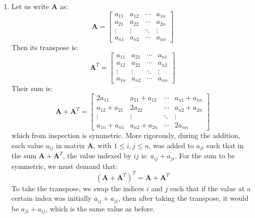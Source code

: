 \begin{sol}
\begin{enumerate}[label=\textbf{(\alph*)}]
    \item Let us write $\bm{A}$ as:
    \begin{equation}
        \bm{A} = \begin{bmatrix}
        a_{11} & a_{12} & \cdots & a_{1n} \\ 
        a_{21} & a_{22} & \cdots & a_{2n} \\ 
        \vdots & \vdots & \ddots & \vdots \\ 
        a_{n1} & a_{n2} & \cdots & a_{nn}
        \end{bmatrix}
    \end{equation}
    Then its transpose is:
    \begin{equation}
        \bm{A}^T = \begin{bmatrix}
        a_{11} & a_{21} & \cdots & a_{n1} \\ 
        a_{12} & a_{22} & \cdots & a_{n2} \\ 
        \vdots & \vdots & \ddots & \vdots \\ 
        a_{1n} & a_{n2} & \cdots & a_{nn}
        \end{bmatrix}
    \end{equation}
    Their sum is:
    \begin{equation}
        \bm{A} + \bm{A}^T = \begin{bmatrix}
        2a_{11} & a_{21} + a_{12} & \cdots & a_{n1} + a_{1n} \\ 
        a_{12} + a_{21} & 2a_{22} & \cdots & a_{n2} + a_{2n} \\ 
        \vdots & \vdots & \ddots & \vdots \\ 
        a_{1n} + a_{n1} & a_{n2} + a_{2n} & \cdots & 2a_{nn}
        \end{bmatrix}
    \end{equation}
    which from inspection is symmetric. More rigorously, during the addition, each value $a_{ij}$ in matrix $\bm{A}$, with $1 \le i,j \le n$, was added to $a_{ji}$ such that in the sum $\bm{A}+\bm{A}^T$, the value indexed by $ij$ is: $a_{ij}+a_{ji}$. For the sum to be symmetric, we must demand that:
    \begin{equation}
        (\bm{A}+\bm{A}^T)^T = \bm{A} + \bm{A}^T
    \end{equation}
    To take the transpose, we swap the indices $i$ and $j$ such that if the value at a certain index was initially $a_{ij}+a_{ji}$, then after taking the transpose, it would be $a_{ji}+a_{ij}$, which is the same value as before.

\end{enumerate}
\end{sol}
